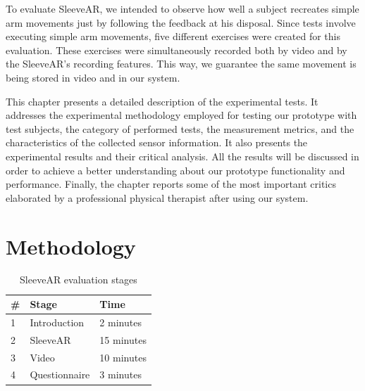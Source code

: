 To evaluate SleeveAR, we intended to observe how well a subject recreates simple arm movements just by following the feedback at his disposal. 
Since tests involve executing simple arm movements, five different exercises were created for this evaluation. These exercises were simultaneously recorded both by video and by the SleeveAR's recording features. This way, we guarantee the same movement is being stored in video and in our system.

This chapter presents a detailed description of the experimental tests. It addresses the experimental methodology employed for testing our prototype with test subjects, the category of performed tests, the measurement metrics, and the characteristics of the collected sensor information. It also presents the experimental results and their critical analysis. All the results will be discussed in order to achieve a better understanding about our prototype functionality and performance.
Finally, the chapter reports some of the most important critics elaborated by a professional physical therapist after using our system.

\section{Methodology} \label{evaluation-methodology}

\begin{table}
\centering
\begin{tabular}{lll}
\hline
\multicolumn{1}{|l|}{\#}& \multicolumn{1}{l|}{Stage}         & \multicolumn{1}{l|}{Time}       \\ \hline
\multicolumn{1}{|l|}{1} & \multicolumn{1}{l|}{Introduction}  & \multicolumn{1}{l|}{2 minutes}  \\ \hline
\multicolumn{1}{|l|}{2} & \multicolumn{1}{l|}{SleeveAR}      & \multicolumn{1}{l|}{15 minutes} \\ \hline
\multicolumn{1}{|l|}{3} & \multicolumn{1}{l|}{Video}         & \multicolumn{1}{l|}{10 minutes} \\ \hline
\multicolumn{1}{|l|}{4} & \multicolumn{1}{l|}{Questionnaire} & \multicolumn{1}{l|}{3 minutes}  \\ \hline
\end{tabular}
\caption{SleeveAR evaluation stages}
\label{table:teststages}
\end{table}


